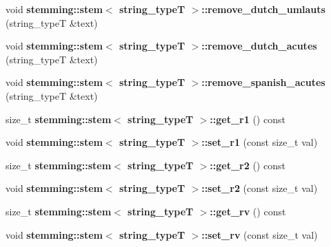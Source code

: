 \begin{DoxyCompactItemize}
\item 
\hypertarget{group___stemming_ga44d995c39f2a31089ae3505fb483cbfa}{void {\bfseries stemming\-::stem$<$ string\-\_\-type\-T $>$\-::remove\-\_\-dutch\-\_\-umlauts} (string\-\_\-type\-T \&text)}\label{group___stemming_ga44d995c39f2a31089ae3505fb483cbfa}

\item 
\hypertarget{group___stemming_ga42ba7697636adbf2d757c360a981920f}{void {\bfseries stemming\-::stem$<$ string\-\_\-type\-T $>$\-::remove\-\_\-dutch\-\_\-acutes} (string\-\_\-type\-T \&text)}\label{group___stemming_ga42ba7697636adbf2d757c360a981920f}

\item 
\hypertarget{group___stemming_ga0b3535733088736897f35f8d925c92e9}{void {\bfseries stemming\-::stem$<$ string\-\_\-type\-T $>$\-::remove\-\_\-spanish\-\_\-acutes} (string\-\_\-type\-T \&text)}\label{group___stemming_ga0b3535733088736897f35f8d925c92e9}

\item 
\hypertarget{group___stemming_ga09ab497dfe31fc007c70d7f7d790fa51}{size\-\_\-t {\bfseries stemming\-::stem$<$ string\-\_\-type\-T $>$\-::get\-\_\-r1} () const }\label{group___stemming_ga09ab497dfe31fc007c70d7f7d790fa51}

\item 
\hypertarget{group___stemming_ga87fa173343063b5e85722edefe493ab5}{void {\bfseries stemming\-::stem$<$ string\-\_\-type\-T $>$\-::set\-\_\-r1} (const size\-\_\-t val)}\label{group___stemming_ga87fa173343063b5e85722edefe493ab5}

\item 
\hypertarget{group___stemming_ga90aba2c99e1fa12883eba32211089f3b}{size\-\_\-t {\bfseries stemming\-::stem$<$ string\-\_\-type\-T $>$\-::get\-\_\-r2} () const }\label{group___stemming_ga90aba2c99e1fa12883eba32211089f3b}

\item 
\hypertarget{group___stemming_ga032bb774988c5b8f6fae7cf28b59d485}{void {\bfseries stemming\-::stem$<$ string\-\_\-type\-T $>$\-::set\-\_\-r2} (const size\-\_\-t val)}\label{group___stemming_ga032bb774988c5b8f6fae7cf28b59d485}

\item 
\hypertarget{group___stemming_gaefa75f006e0b4b623a2608dc23dff605}{size\-\_\-t {\bfseries stemming\-::stem$<$ string\-\_\-type\-T $>$\-::get\-\_\-rv} () const }\label{group___stemming_gaefa75f006e0b4b623a2608dc23dff605}

\item 
\hypertarget{group___stemming_ga1fda692e873dfcae7048679ffdb29a5e}{void {\bfseries stemming\-::stem$<$ string\-\_\-type\-T $>$\-::set\-\_\-rv} (const size\-\_\-t val)}\label{group___stemming_ga1fda692e873dfcae7048679ffdb29a5e}


\end{DoxyCompactItemize}
